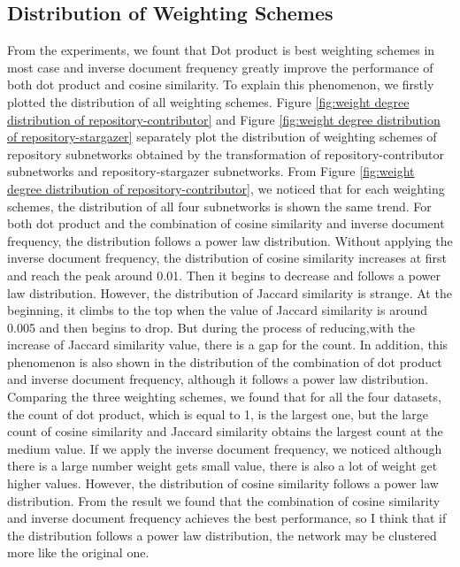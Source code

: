 \documentclass[12pt,oneside,final]{vlsithesis}
\begin{document}
\subsection{Distribution of Weighting Schemes}
From the experiments, we fount that Dot product is best weighting schemes in most case and inverse document frequency greatly improve the performance of both dot product and cosine similarity. To explain this phenomenon, we firstly plotted the distribution of all weighting schemes. Figure \ref{fig:weight degree distribution of repository-contributor} and Figure \ref{fig:weight degree distribution of repository-stargazer} separately plot the distribution of weighting schemes of repository subnetworks obtained by the transformation of repository-contributor subnetworks and repository-stargazer subnetworks. From Figure \ref{fig:weight degree distribution of repository-contributor}, we noticed that for each weighting schemes, the distribution of all four subnetworks is shown the same trend. For both dot product and the combination of cosine similarity and inverse document frequency, the distribution follows a power law distribution. Without applying the inverse document frequency, the distribution of cosine similarity increases at first and reach the peak around 0.01. Then it begins to decrease and follows a power law distribution. However, the distribution of Jaccard similarity is strange. At the beginning, it climbs to the top when the value of Jaccard similarity is around 0.005 and then begins to drop. But during the process of reducing,with the increase of Jaccard similarity value, there is a gap for the count. In addition, this phenomenon is also shown in the distribution of the combination of dot product and inverse document frequency, although it follows a power law distribution. Comparing the three weighting schemes, we found that for all the four datasets, the count of dot product, which is equal to 1, is the largest one, but the large count of cosine similarity and Jaccard similarity obtains the largest count at the medium value. If we apply the inverse document frequency, we noticed although there is a large number weight gets small value, there is also a lot of weight get higher values. However, the distribution of cosine similarity follows a power law distribution. From the result we found that the combination of cosine similarity and inverse document frequency achieves the best performance, so I think that if the distribution follows a power law distribution, the network may be clustered more like the original one. 
\end{document}
